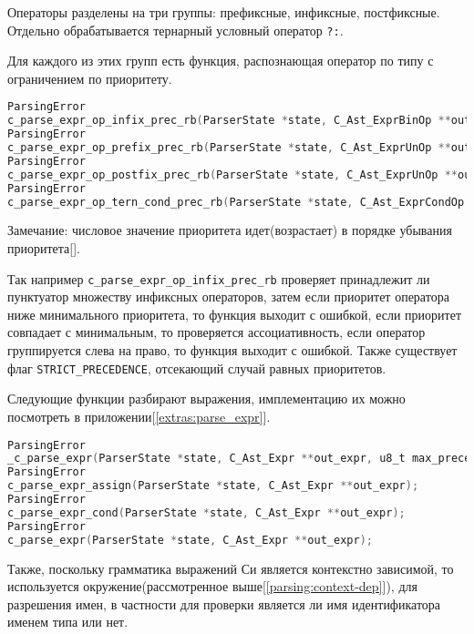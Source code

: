Операторы разделены на три группы: префиксные, инфиксные, постфиксные.
Отдельно обрабатывается тернарный условный оператор \verb|?:|.

Для каждого из этих групп есть функция, распознающая оператор по типу с ограничением по приоритету.

\begin{lstlisting}[language=c, caption={Функции разбора операторов}, label={parsing:expr:parse-op-headers}]
ParsingError
c_parse_expr_op_infix_prec_rb(ParserState *state, C_Ast_ExprBinOp **out_binop, u8_t max_precedence, bool is_strict_precedence);
ParsingError
c_parse_expr_op_prefix_prec_rb(ParserState *state, C_Ast_ExprUnOp **out_unop, u8_t max_precedence, bool is_strict_precedence);
ParsingError
c_parse_expr_op_postfix_prec_rb(ParserState *state, C_Ast_ExprUnOp **out_unop, u8_t max_precedence);
ParsingError
c_parse_expr_op_tern_cond_prec_rb(ParserState *state, C_Ast_ExprCondOp **out_tern, u8_t max_precedence, bool is_strict_precedence);
\end{lstlisting}

Замечание: числовое значение приоритета идет(возрастает) в порядке убывания приоритета[\cite{cppref_op_prec}].

Так например \verb|c_parse_expr_op_infix_prec_rb| проверяет принадлежит ли пунктуатор множеству инфиксных операторов,
затем если приоритет оператора ниже минимального приоритета, то функция выходит с ошибкой, 
если приоритет совпадает с минимальным, то проверяется ассоциативность, если оператор группируется слева на право, то функция выходит с ошибкой.
Также существует флаг \verb|STRICT_PRECEDENCE|, отсекающий случай равных приоритетов.

Следующие функции разбирают выражения, имплементацию их можно посмотреть в приложении[\ref{extras:parse_expr}].

\begin{lstlisting}[language=c, caption={Заголовки функции разбора выражений}, label={parsing:expr:parse-expr-headers}]
ParsingError
_c_parse_expr(ParserState *state, C_Ast_Expr **out_expr, u8_t max_precedence, C_ExprFlags flags);
ParsingError
c_parse_expr_assign(ParserState *state, C_Ast_Expr **out_expr);
ParsingError
c_parse_expr_cond(ParserState *state, C_Ast_Expr **out_expr);
ParsingError
c_parse_expr(ParserState *state, C_Ast_Expr **out_expr);
\end{lstlisting}

Также, поскольку грамматика выражений Си является контекстно зависимой, то используется окружение(рассмотренное выше[\ref{parsing:context-dep}]), для разрешения имен,
в частности для проверки является ли имя идентификатора именем типа или нет.

